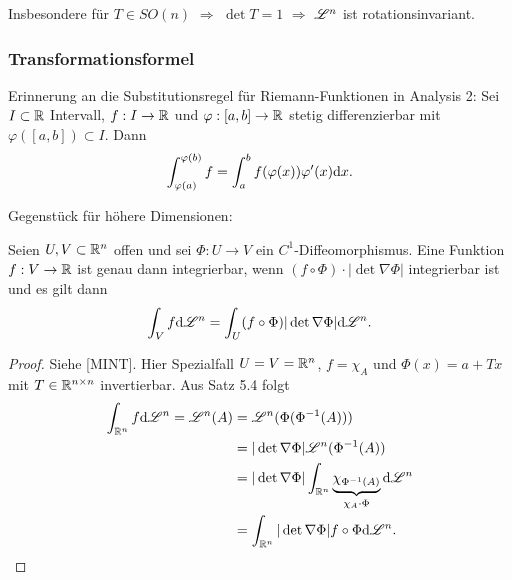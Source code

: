 Insbesondere für $T \in SO(n)$ $\Rightarrow$ $\det T = 1$ $\Rightarrow$ $\mathscr{L}^n$ ist rotationsinvariant.

\clearpage

\subsubsection{Transformationsformel}
Erinnerung an die Substitutionsregel für Riemann-Funktionen in Analysis 2: Sei $I \subset \mathbb{R}$ Intervall, $f:I \to \mathbb{R}$ und $\varphi:[a,b] \to \mathbb{R}$ stetig differenzierbar mit $\varphi([a,b]) \subset I$. Dann
\[ \int_{\varphi(a)}^{\varphi(b)} f = \int_a^b f(\varphi(x)) \varphi'(x) \mathrm{d} x. \]

Gegenstück für höhere Dimensionen:
\begin{thm}
 Seien $U,V \subset \mathbb{R}^n$ offen und sei $\Phi: U \to V$ ein $C^1$-Diffeomorphismus\footnotemark. Eine Funktion $f: V \to \mathbb{R}$ ist genau dann integrierbar, wenn $(f \circ \Phi) \cdot | \det \nabla \Phi |$ integrierbar ist und es gilt dann
 \[ \int_V f \mathrm{d} \mathscr{L}^n = \int_U (f \circ \Phi) | \det \nabla \Phi | \mathrm{d} \mathscr{L}^n. \]
\end{thm}

\begin{proof}
 Siehe [MINT]. Hier Spezialfall $U=V=\mathbb{R}^n$, $f = \chi_A$ und $\Phi(x) = a + Tx$ mit $T \in \mathbb{R}^{n \times n}$ invertierbar. Aus Satz 5.4 folgt
 \begin{align*}
    \int_{\mathbb{R}^n} f \mathrm{d} \mathscr{L}^n = \mathscr{L}^n(A)
    &= \mathscr{L}^n ( \Phi( \Phi^{-1}( A ) )) \\
    &= | \det \nabla \Phi | \mathscr{L}^n( \Phi^{-1}(A) ) \\
    &= | \det \nabla \Phi | \int_{\mathbb{R}^n} \underbrace{\chi_{\Phi^{-1}(A)}}_{\chi_A \cdot \Phi} \mathrm{d} \mathscr{L}^n \\
    &= \int_{\mathbb{R}^n} | \det\nabla \Phi | f \circ \Phi \mathrm{d} \mathscr{L}^n. \qedhere
 \end{align*}
\end{proof}

